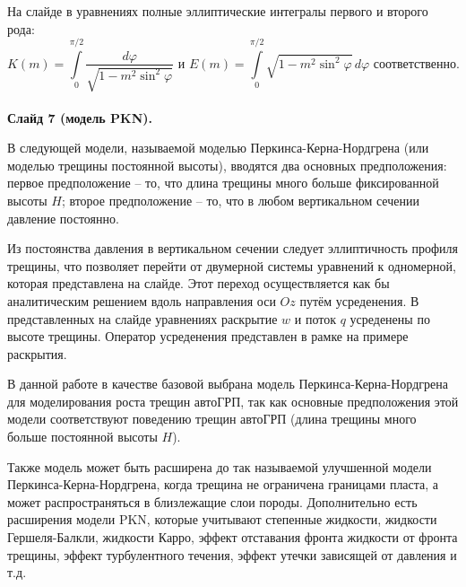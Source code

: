 \documentclass[a4paper, 12pt]{article}
\begin{document}
На слайде в уравнениях полные эллиптические интегралы первого и второго рода:
$$K(m)=\int\limits_{0}^{\pi/2}{\frac{d\varphi}{\sqrt{1-m^2\sin^2{\!\varphi}}}}\text{ и } E(m)=\int\limits_{0}^{\pi/2}{\sqrt{1-m^2\sin^2{\!\varphi}}\,d\varphi}\text{ соответственно.}$$\\

\textbf{Слайд 7 (модель PKN).}

В следующей модели, называемой моделью Перкинса-Керна-Нордгрена (или моделью трещины постоянной высоты), вводятся два основных предположения: первое предположение -- то, что длина трещины много больше фиксированной высоты $H$; второе предположение -- то, что в любом вертикальном сечении давление постоянно.

Из постоянства давления в вертикальном сечении следует эллиптичность профиля трещины, что позволяет перейти от двумерной системы уравнений к одномерной, которая представлена на слайде.
Этот переход осуществляется как бы аналитическим решением вдоль направления оси $Oz$ путём усреденения.
В представленных на слайде уравнениях раскрытие $w$ и поток $q$ усреденены по высоте трещины.
Оператор усреденения представлен в рамке на примере раскрытия.

В данной работе в качестве базовой выбрана модель Перкинса-Керна-Нордгрена для моделирования роста трещин автоГРП, так как основные предположения этой модели соответствуют поведению трещин автоГРП (длина трещины много больше постоянной высоты $H$).


Также модель может быть расширена до так называемой улучшенной модели Перкинса-Керна-Нордгрена, когда трещина не ограничена границами пласта, а может распространяться в близлежащие слои породы.
Дополнительно есть расширения модели PKN, которые учитывают степенные жидкости, жидкости Гершеля-Балкли, жидкости Карро, эффект отставания фронта жидкости от фронта трещины, эффект турбулентного течения, эффект утечки зависящей от давления и т.д.
\end{document}
